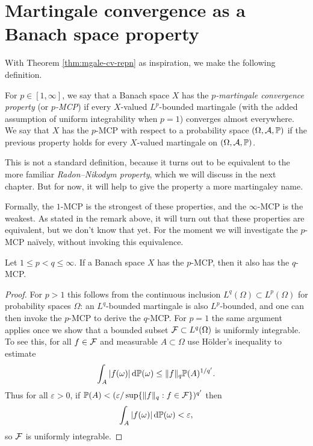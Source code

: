\section{Martingale convergence as a Banach space property}

With Theorem \ref{thm:mgale-cv-repn} as inspiration, we make the following definition.

\begin{defn}
  For $p \in [1,\infty]$, we say that a Banach space $X$ has the \emph{$p$-martingale convergence property} (or \emph{$p$-MCP}) if every $X$-valued $L^p$-bounded martingale (with the added assumption of uniform integrability when $p=1$) converges almost everywhere.
  We say that $X$ has the $p$-MCP with respect to a probability space $(\Omega,\mathcal{A},\mathbb{P})$ if the previous property holds for every $X$-valued martingale on $(\Omega,\mathcal{A},\mathbb{P})$.
\end{defn}

\begin{rmk}
  This is not a standard definition, because it turns out to be equivalent to the more familiar \emph{Radon--Nikodym property}, which we will discuss in the next chapter. But for now, it will help to give the property a more martingaley name.
\end{rmk}

Formally, the $1$-MCP is the strongest of these properties, and the $\infty$-MCP is the weakest.
As stated in the remark above, it will turn out that these properties are equivalent, but we don't know that yet.
For the moment we will investigate the $p$-MCP na\"ively, without invoking this equivalence.

\begin{prop}
  Let $1 \leq p < q \leq \infty$.
  If a Banach space $X$ has the $p$-MCP, then it also has the $q$-MCP.
\end{prop}

\begin{proof}
  For $p > 1$ this follows from the continuous inclusion $L^q(\Omega) \subset L^p(\Omega)$ for probability spaces $\Omega$: an $L^q$-bounded martingale is also $L^p$-bounded, and one can then invoke the $p$-MCP to derive the $q$-MCP.
  For $p = 1$ the same argument applies once we show that a bounded subset $\mathcal{F} \subset L^q(\Omega)$ is uniformly integrable.
  To see this, for all $f \in \mathcal{F}$ and measurable $A \subset \Omega$ use H\"older's inequality to estimate
  \begin{equation*}
    \int_{A} |f(\omega)| \, \mathrm{d}\mathbb{P}(\omega) \leq \|f\|_{q} \mathbb{P}(A)^{1/q'}.
  \end{equation*}
  Thus for all $\varepsilon > 0$, if $\mathbb{P}(A) < (\varepsilon/\sup\{\|f\|_q : f \in \mathcal{F}\})^{q'}$ then
  \begin{equation*}
    \int_{A} |f(\omega)| \, \mathrm{d}\mathbb{P}(\omega) < \varepsilon,
  \end{equation*}
  so $\mathcal{F}$ is uniformly integrable.
\end{proof}

